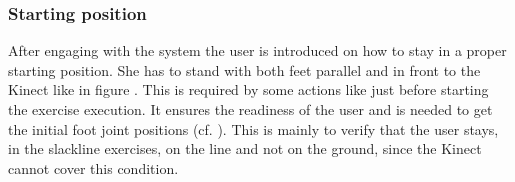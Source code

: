 \subsubsection{Starting position}\label{5_2_1_startingPosition}
After engaging with the system the user is introduced on how to stay in a proper starting position. She has to stand with both feet parallel and in front to the Kinect like in figure . This is required by some actions like just before starting the exercise execution. It ensures the readiness of the user and is needed to get the initial foot joint positions (cf. ). This is mainly to verify that the user stays, in the slackline exercises, on the line and not on the ground, since the Kinect cannot cover this condition.

